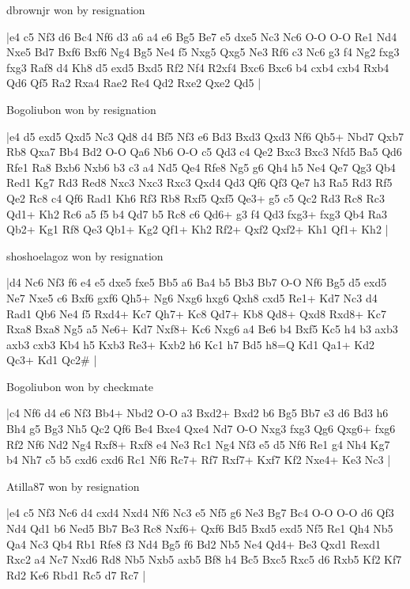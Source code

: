 \showboard

dbrownjr won by resignation

\makegametitle
|e4 c5 Nf3 d6 Bc4 Nf6 d3 a6 a4 e6 Bg5 Be7 e5 dxe5 Nc3 Nc6 O-O O-O Re1 Nd4 Nxe5 Bd7 Bxf6 Bxf6 Ng4 Bg5 Ne4 f5 Nxg5 Qxg5 Ne3 Rf6 c3 Nc6 g3 f4 Ng2 fxg3 fxg3 Raf8 d4 Kh8 d5 exd5 Bxd5 Rf2 Nf4 R2xf4 Bxc6 Bxc6 b4 cxb4 cxb4 Rxb4 Qd6 Qf5 Ra2 Rxa4 Rae2 Re4 Qd2 Rxe2 Qxe2 Qd5  |

\showboard

Bogoliubon won by resignation

\makegametitle
|e4 d5 exd5 Qxd5 Nc3 Qd8 d4 Bf5 Nf3 e6 Bd3 Bxd3 Qxd3 Nf6 Qb5+ Nbd7 Qxb7 Rb8 Qxa7 Bb4 Bd2 O-O Qa6 Nb6 O-O c5 Qd3 c4 Qe2 Bxc3 Bxc3 Nfd5 Ba5 Qd6 Rfe1 Ra8 Bxb6 Nxb6 b3 c3 a4 Nd5 Qe4 Rfe8 Ng5 g6 Qh4 h5 Ne4 Qe7 Qg3 Qb4 Red1 Kg7 Rd3 Red8 Nxc3 Nxc3 Rxc3 Qxd4 Qd3 Qf6 Qf3 Qe7 h3 Ra5 Rd3 Rf5 Qe2 Rc8 c4 Qf6 Rad1 Kh6 Rf3 Rb8 Rxf5 Qxf5 Qe3+ g5 c5 Qc2 Rd3 Rc8 Rc3 Qd1+ Kh2 Rc6 a5 f5 b4 Qd7 b5 Rc8 c6 Qd6+ g3 f4 Qd3 fxg3+ fxg3 Qb4 Ra3 Qb2+ Kg1 Rf8 Qe3 Qb1+ Kg2 Qf1+ Kh2 Rf2+ Qxf2 Qxf2+ Kh1 Qf1+ Kh2  |

\showboard

shoshoelagoz won by resignation

\makegametitle
|d4 Nc6 Nf3 f6 e4 e5 dxe5 fxe5 Bb5 a6 Ba4 b5 Bb3 Bb7 O-O Nf6 Bg5 d5 exd5 Ne7 Nxe5 c6 Bxf6 gxf6 Qh5+ Ng6 Nxg6 hxg6 Qxh8 cxd5 Re1+ Kd7 Nc3 d4 Rad1 Qb6 Ne4 f5 Rxd4+ Kc7 Qh7+ Kc8 Qd7+ Kb8 Qd8+ Qxd8 Rxd8+ Kc7 Rxa8 Bxa8 Ng5 a5 Ne6+ Kd7 Nxf8+ Kc6 Nxg6 a4 Be6 b4 Bxf5 Kc5 h4 b3 axb3 axb3 cxb3 Kb4 h5 Kxb3 Re3+ Kxb2 h6 Kc1 h7 Bd5 h8=Q Kd1 Qa1+ Kd2 Qc3+ Kd1 Qc2\#  |

\showboard

Bogoliubon won by checkmate

\makegametitle
|c4 Nf6 d4 e6 Nf3 Bb4+ Nbd2 O-O a3 Bxd2+ Bxd2 b6 Bg5 Bb7 e3 d6 Bd3 h6 Bh4 g5 Bg3 Nh5 Qc2 Qf6 Be4 Bxe4 Qxe4 Nd7 O-O Nxg3 fxg3 Qg6 Qxg6+ fxg6 Rf2 Nf6 Nd2 Ng4 Rxf8+ Rxf8 e4 Ne3 Rc1 Ng4 Nf3 e5 d5 Nf6 Re1 g4 Nh4 Kg7 b4 Nh7 c5 b5 cxd6 cxd6 Rc1 Nf6 Rc7+ Rf7 Rxf7+ Kxf7 Kf2 Nxe4+ Ke3 Nc3  |

\showboard

Atilla87 won by resignation

\makegametitle
|e4 c5 Nf3 Nc6 d4 cxd4 Nxd4 Nf6 Nc3 e5 Nf5 g6 Ne3 Bg7 Bc4 O-O O-O d6 Qf3 Nd4 Qd1 b6 Ned5 Bb7 Be3 Rc8 Nxf6+ Qxf6 Bd5 Bxd5 exd5 Nf5 Re1 Qh4 Nb5 Qa4 Nc3 Qb4 Rb1 Rfe8 f3 Nd4 Bg5 f6 Bd2 Nb5 Ne4 Qd4+ Be3 Qxd1 Rexd1 Rxc2 a4 Nc7 Nxd6 Rd8 Nb5 Nxb5 axb5 Bf8 h4 Bc5 Bxc5 Rxc5 d6 Rxb5 Kf2 Kf7 Rd2 Ke6 Rbd1 Rc5 d7 Rc7  |

